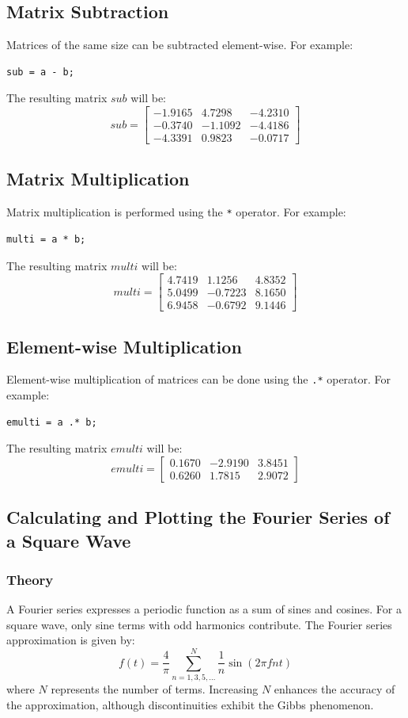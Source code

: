 \documentclass[a4paper,12pt]{article}
\begin{document}
\subsection*{Matrix Subtraction}
Matrices of the same size can be subtracted element-wise. For example:
\begin{lstlisting}[style=vscode-light]
	sub = a - b;
\end{lstlisting}
The resulting matrix \( sub \) will be:
\[
sub = \begin{bmatrix}
	-1.9165 & 4.7298 & -4.2310 \\
	-0.3740 & -1.1092 & -4.4186 \\
	-4.3391 & 0.9823 & -0.0717
\end{bmatrix}
\]

\subsection*{Matrix Multiplication}
Matrix multiplication is performed using the \texttt{*} operator. For example:
\begin{lstlisting}[style=vscode-light]
	multi = a * b;
\end{lstlisting}
The resulting matrix \( multi \) will be:
\[
multi = \begin{bmatrix}
	4.7419 & 1.1256 & 4.8352 \\
	5.0499 & -0.7223 & 8.1650 \\
	6.9458 & -0.6792 & 9.1446
\end{bmatrix}
\]

\subsection*{Element-wise Multiplication}
Element-wise multiplication of matrices can be done using the \texttt{.*} operator. For example:
\begin{lstlisting}[style=vscode-light]
	emulti = a .* b;
\end{lstlisting}
The resulting matrix \( emulti \) will be:
\[
emulti = \begin{bmatrix}
	0.1670 & -2.9190 & 3.8451 \\
	0.6260 & 1.7815 & 2.9072
\end{bmatrix}
\]
\newpage
\subsection{Calculating and Plotting the Fourier Series of a Square Wave}

\subsubsection*{Theory}
A Fourier series expresses a periodic function as a sum of sines and cosines. For a square wave, only sine terms with odd harmonics contribute. The Fourier series approximation is given by:
\[
f(t) = \frac{4}{\pi} \sum_{n=1,3,5,\dots}^{N} \frac{1}{n} \sin(2\pi fnt)
\]
where \( N \) represents the number of terms. Increasing \( N \) enhances the accuracy of the approximation, although discontinuities exhibit the Gibbs phenomenon.
\end{document}
